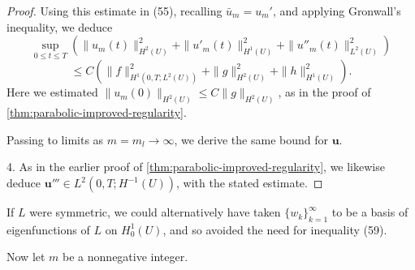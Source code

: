 \begin{proof}
Using this estimate in (55), recalling $\bar{u}_m = u_m'$, and applying Gronwall's inequality, we deduce
\[
\sup_{0 \le t \le T} \left( \|u_m(t)\|^2_{H^2(U)} + \|u'_m(t)\|^2_{H^1(U)} + \|u''_m(t)\|^2_{L^2(U)} \right)
\]
\[
\le C\left( \|f\|^2_{H^1(0,T;L^2(U))} + \|g\|^2_{H^2(U)} + \|h\|^2_{H^1(U)} \right).
\tag{61}
\]
Here we estimated $\|u_m(0)\|_{H^2(U)} \le C\|g\|_{H^2(U)}$, as in the proof of \cref{thm:parabolic-improved-regularity}.

Passing to limits as $m = m_l \to \infty$, we derive the same bound for $\mathbf{u}$.

4. As in the earlier proof of \cref{thm:parabolic-improved-regularity}, we likewise deduce $\mathbf{u}''' \in L^2(0, T; H^{-1}(U))$, with the stated estimate.
\end{proof}

\begin{remark}
\label{rem:hyperbolic-symmetric-eigenfunctions}
If $L$ were symmetric, we could alternatively have taken $\{w_k\}_{k=1}^\infty$ to be a basis of eigenfunctions of $L$ on $H^1_0(U)$, and so avoided the need for inequality (59).
\end{remark}

Now let $m$ be a nonnegative integer.

